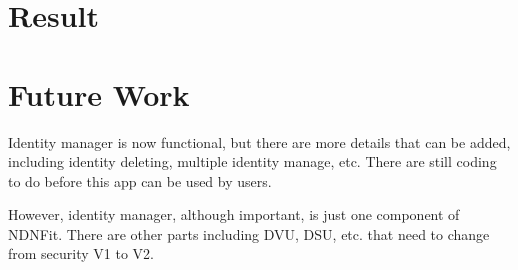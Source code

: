 \documentclass[a0,portrait]{poster}
\begin{document}
\begin{multicols}{2}

\section*{Result}







\section*{Future Work}

\par 
	Identity manager is now functional, but there are more details that can be added, including identity deleting, multiple identity manage, etc. 
	There are still coding to do before this app can be used by users.
\par 
	However, identity manager, although important, is just one component of NDNFit. 
	There are other parts including DVU, DSU, etc. that need to change from security V1 to V2.

\nocite{*} %


\end{multicols}
\end{document}
